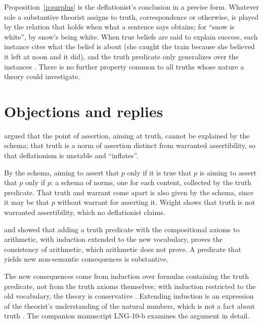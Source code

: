 \documentclass{situationist-preprint}
\begin{document}
Proposition~\ref{p:surplus} is the deflationist's conclusion in a precise form. Whatever role a substantive theorist assigns to truth, correspondence or otherwise, is played by the relation that holds when what a sentence says obtains; for \enquote{snow is white}, by snow's being white. When true beliefs are said to explain success, each instance cites what the belief is about (she caught the train because she believed it left at noon and it did), and the truth predicate only generalizes over the instances \citep{Leeds1978}. There is no further property common to all truths whose nature a theory could investigate.

\section{Objections and replies}\label{s:obj}

\begin{objection}
\citet{Dummett1959} argued that the point of assertion, aiming at truth, cannot be explained by the schema; \citet{Wright1992} that truth is a norm of assertion distinct from warranted assertibility, so that deflationism is unstable and \enquote{inflates}.
\end{objection}

\begin{reply}
By the schema, aiming to assert that $p$ only if it is true that $p$ is aiming to assert that $p$ only if $p$: a schema of norms, one for each content, collected by the truth predicate. That truth and warrant come apart is also given by the schema, since it may be that $p$ without warrant for asserting it. Wright shows that truth is not warranted assertibility, which no deflationist claims.
\end{reply}

\begin{objection}[Conservativeness]
\citet{Shapiro1998} and \citet{Ketland1999} showed that adding a truth predicate with the compositional axioms to arithmetic, with induction extended to the new vocabulary, proves the consistency of arithmetic, which arithmetic does not prove. A predicate that yields new non-semantic consequences is substantive.
\end{objection}

\begin{reply}
The new consequences come from induction over formulas containing the truth predicate, not from the truth axioms themselves; with induction restricted to the old vocabulary, the theory is conservative \citep{Halbach2011}. Extending induction is an expression of the theorist's understanding of the natural numbers, which is not a fact about truth \citep{Field1999}. The companion manuscript LNG-10-b examines the argument in detail.
\end{reply}
\end{document}
